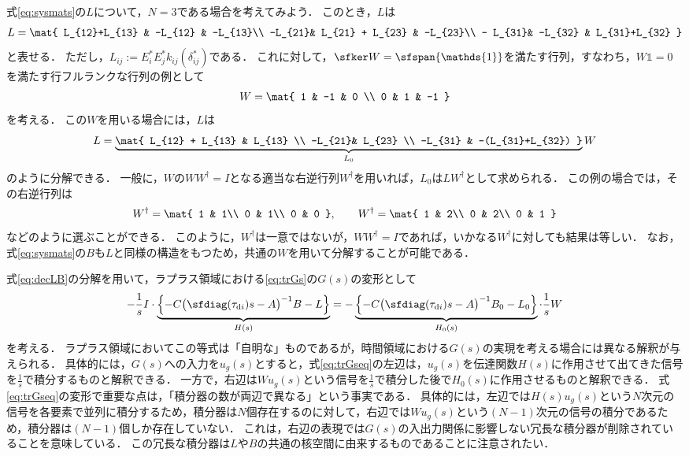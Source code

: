 \documentclass[a4j,10pt,oneside,openany,dvipdfmx]{jsbook}
\begin{document}
\begin{example}[同一の核空間をもつ行列による分解]\label{ex:Ldec}
式\eqref{eq:sysmats}の$L$について，$N=3$である場合を考えてみよう．
このとき，$L$は
\[
L=
\mat{
L_{12}+L_{13} & -L_{12} & -L_{13}\\
-L_{21}& L_{21} + L_{23} & -L_{23}\\
- L_{31}& -L_{32} & L_{31}+L_{32}
}
\]
と表せる．
ただし，$L_{ij}:= E_i^* E_j^* k_{ij}(\delta_{ij}^*)$である．
これに対して，$\sfker W = \sfspan\{ \mathds{1}\}$を満たす行列，すなわち，$W \mathds{1}=0$を満たす行フルランクな行列の例として
\[
W=\mat{
1 & -1 & 0 \\
0 & 1 & -1
}
\]
を考える．
この$W$を用いる場合には，$L$は
\[
L = \underbrace{
\mat{
L_{12} + L_{13} & L_{13} \\
-L_{21}& L_{23} \\
-L_{31} & -(L_{31}+L_{32})
}
}_{L_0}
W
\]
のように分解できる．
一般に，$W$の$WW^{\dagger}=I$となる適当な右逆行列$W^{\dagger}$を用いれば，$L_0$は$LW^{\dagger}$として求められる．
この例の場合では，その右逆行列は
\[
W^{\dagger} = \mat{
1 & 1\\
0 & 1\\
0 & 0
}
,\qquad
W^{\dagger} = \mat{
1 & 2\\
0 & 2\\
0 & 1
}
\]
などのように選ぶことができる．
このように，$W^{\dagger}$は一意ではないが，$WW^{\dagger}=I$であれば，いかなる$W^{\dagger}$に対しても結果は等しい．
なお，式\eqref{eq:sysmats}の$B$も$L$と同様の構造をもつため，共通の$W$を用いて分解することが可能である．
\end{example}

式\eqref{eq:decLB}の分解を用いて，ラプラス領域における\eqref{eq:trGs}の$G(s)$の変形として
\begin{equation}\label{eq:trGseq}
- \frac{1}{s} I \cdot
\underbrace{
\left\{ -C \bigl( \sfdiag(\tau_{{\rm d}i})s -A \bigr)^{-1} B - L \right\}
}_{H(s)}
=
- 
\underbrace{
\left\{ -C \bigl( \sfdiag(\tau_{{\rm d}i})s -A \bigr)^{-1} B_0 - L_0 \right\} 
}_{H_0(s)}
\cdot
\frac{1}{s} W
\end{equation}
を考える．
ラプラス領域においてこの等式は「自明な」ものであるが，時間領域における$G(s)$の実現を考える場合には異なる解釈が与えられる．
具体的には，$G(s)$への入力を$u_g(s)$とすると，式\eqref{eq:trGseq}の左辺は，$u_g(s)$を伝達関数$H(s)$に作用させて出てきた信号を$\frac{1}{s}$で積分するものと解釈できる．
一方で，右辺は$W u_g(s)$という信号を$\frac{1}{s}$で積分した後で$H_0(s)$に作用させるものと解釈できる．
式\eqref{eq:trGseq}の変形で重要な点は，「積分器の数が両辺で異なる」という事実である．
具体的には，左辺では$H(s) u_g(s)$という$N$次元の信号を各要素で並列に積分するため，積分器は$N$個存在するのに対して，右辺では$W u_g(s)$という$(N-1)$次元の信号の積分であるため，積分器は$(N-1)$個しか存在していない．
これは，右辺の表現では$G(s)$の入出力関係に影響しない冗長な積分器が削除されていることを意味している．
この冗長な積分器は$L$や$B$の共通の核空間に由来するものであることに注意されたい．
\end{document}
